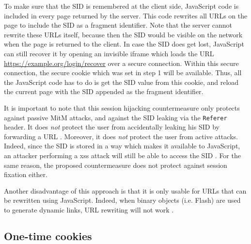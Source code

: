 To make sure that the SID is remembered at the client side, JavaScript code is included in every page returned by the server. This code rewrites all URLs on the page to include the SID as a fragment identifier. Note that the server cannot rewrite these URLs itself, because then the SID would be visible on the network when the page is returned to the client. In case the SID does get lost, JavaScript can still recover it by opening an invisible iframe which loads the URL \url{https://example.org/login/recover} over a secure connection. Within this secure connection, the secure cookie which was set in step 1 will be available. Thus, all the JavaScript code has to do is get the SID value from this cookie, and reload the current page with the SID appended as the fragment identifier.

It is important to note that this session hijacking countermeasure only protects against passive MitM attacks, and against the SID leaking via the \texttt{Referer} header. It does \emph{not} protect the user from accidentally leaking his SID by forwarding a URL \cite{Adida2008}. Moreover, it does \emph{not} protect the user from active attacks. Indeed, since the SID is stored in a way which makes it available to JavaScript, an attacker performing a \gls{xss} attack will still be able to access the SID \cite{Dacosta2011}. For the same reason, the proposed countermeasure does not protect against session fixation either.

Another disadvantage of this approach is that it is only usable for URLs that can be rewritten using JavaScript. Indeed, when binary objects (i.e. Flash) are used to generate dynamic links, URL rewriting will not work \cite{Dacosta2011}.

\subsection{One-time cookies}

